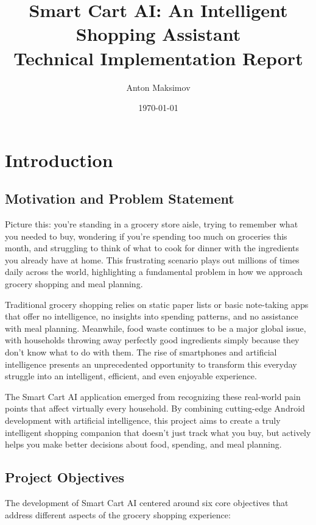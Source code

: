 \documentclass[11pt,a4paper]{article}
\title{\textbf{Smart Cart AI: An Intelligent Shopping Assistant\\Technical Implementation Report}}
\author{Anton Maksimov}
\date{\today}
\begin{document}
\maketitle

\tableofcontents
\newpage

\section{Introduction}

\subsection{Motivation and Problem Statement}

Picture this: you're standing in a grocery store aisle, trying to remember what you needed to buy, wondering if you're spending too much on groceries this month, and struggling to think of what to cook for dinner with the ingredients you already have at home. This frustrating scenario plays out millions of times daily across the world, highlighting a fundamental problem in how we approach grocery shopping and meal planning.

Traditional grocery shopping relies on static paper lists or basic note-taking apps that offer no intelligence, no insights into spending patterns, and no assistance with meal planning. Meanwhile, food waste continues to be a major global issue, with households throwing away perfectly good ingredients simply because they don't know what to do with them. The rise of smartphones and artificial intelligence presents an unprecedented opportunity to transform this everyday struggle into an intelligent, efficient, and even enjoyable experience.

The Smart Cart AI application emerged from recognizing these real-world pain points that affect virtually every household. By combining cutting-edge Android development with artificial intelligence, this project aims to create a truly intelligent shopping companion that doesn't just track what you buy, but actively helps you make better decisions about food, spending, and meal planning.

\subsection{Project Objectives}

The development of Smart Cart AI centered around six core objectives that address different aspects of the grocery shopping experience:
\end{document}
